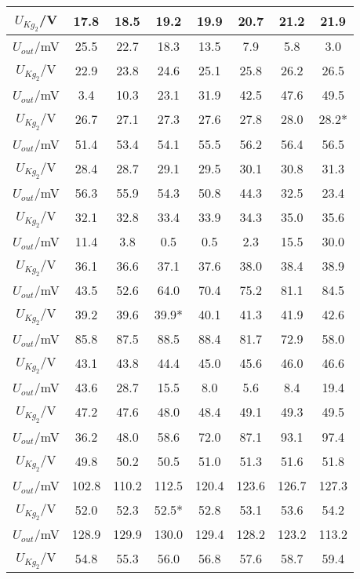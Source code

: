 \documentclass[a4paper,11pt]{article}
\begin{document}
\begin{CJK*}{UTF8}{gbsn}
\begin{longtable}{|c|c|c|c|c|c|c|c|}
\hline\hline
$U_{Kg_2}$/V & 17.8 & 18.5 & 19.2 & 19.9 & 20.7 & 21.2 & 21.9 \\
\hline
$U_{out}$/mV & 25.5 & 22.7 & 18.3 & 13.5 & 7.9 & 5.8 & 3.0 \\ 
\hline\hline
$U_{Kg_2}$/V & 22.9 & 23.8 & 24.6 & 25.1 & 25.8 & 26.2 & 26.5 \\
\hline 
$U_{out}$/mV & 3.4 & 10.3 & 23.1 & 31.9 & 42.5 & 47.6 & 49.5 \\
\hline\hline 
$U_{Kg_2}$/V & 26.7 & 27.1 & 27.3 & 27.6 & 27.8 & 28.0 & 28.2* \\
\hline  
$U_{out}$/mV & 51.4 & 53.4 & 54.1 & 55.5 & 56.2 & 56.4 & 56.5 \\
\hline\hline 
$U_{Kg_2}$/V & 28.4 & 28.7 & 29.1 & 29.5 & 30.1 & 30.8 & 31.3 \\
\hline	
$U_{out}$/mV & 56.3 & 55.9 & 54.3 & 50.8 & 44.3 & 32.5 & 23.4 \\
\hline\hline	
$U_{Kg_2}$/V & 32.1 & 32.8 & 33.4 & 33.9 & 34.3 & 35.0 & 35.6 \\
\hline		
$U_{out}$/mV & 11.4 & 3.8 & 0.5 & 0.5 & 2.3 & 15.5 & 30.0 \\
\hline\hline	
$U_{Kg_2}$/V & 36.1 & 36.6 & 37.1 & 37.6 & 38.0 & 38.4 & 38.9 \\
\hline		
$U_{out}$/mV & 43.5 & 52.6 & 64.0 & 70.4 & 75.2 & 81.1 & 84.5 \\
\hline\hline
$U_{Kg_2}$/V & 39.2 & 39.6 & 39.9* & 40.1 & 41.3 & 41.9 & 42.6 \\
\hline		
$U_{out}$/mV & 85.8 & 87.5 & 88.5 & 88.4 & 81.7 & 72.9 & 58.0 \\
\hline\hline	
$U_{Kg_2}$/V & 43.1 & 43.8 & 44.4 & 45.0 & 45.6 & 46.0 & 46.6 \\
\hline		
$U_{out}$/mV & 43.6 & 28.7 & 15.5 & 8.0 & 5.6 & 8.4 & 19.4 \\
\hline\hline	
$U_{Kg_2}$/V & 47.2 & 47.6 & 48.0 & 48.4 & 49.1 & 49.3 & 49.5 \\
\hline		
$U_{out}$/mV & 36.2 & 48.0 & 58.6 & 72.0 & 87.1 & 93.1 & 97.4 \\
\hline\hline	
$U_{Kg_2}$/V & 49.8 & 50.2 & 50.5 & 51.0 & 51.3 & 51.6 & 51.8 \\
\hline		
$U_{out}$/mV & 102.8 & 110.2 & 112.5 & 120.4 & 123.6 & 126.7 & 127.3 \\
\hline\hline	
$U_{Kg_2}$/V & 52.0 & 52.3 & 52.5* & 52.8 & 53.1 & 53.6 & 54.2 \\
\hline		
$U_{out}$/mV & 128.9 & 129.9 & 130.0 & 129.4 & 128.2 & 123.2 & 113.2 \\
\hline\hline	
$U_{Kg_2}$/V & 54.8 & 55.3 & 56.0 & 56.8 & 57.6 & 58.7 & 59.4 \\

\end{longtable}
\end{CJK*}
\end{document}
